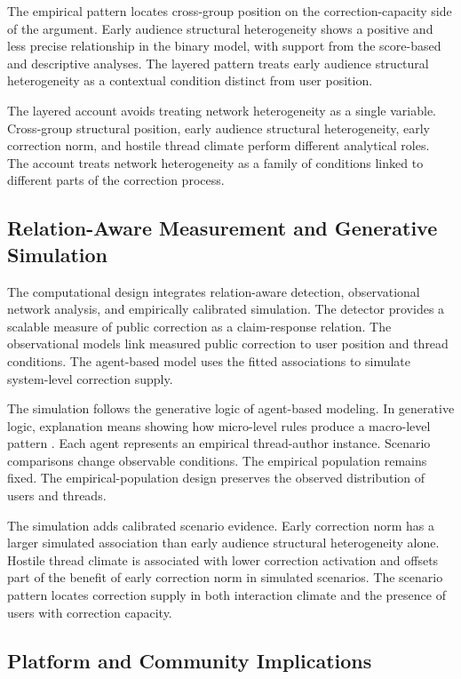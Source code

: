 \documentclass[namedate,unnumsec,webpdf,contemporary,large]{oup-authoring-template}
\begin{document}
The empirical pattern locates cross-group position on the correction-capacity side of the argument. Early audience structural heterogeneity shows a positive and less precise relationship in the binary model, with support from the score-based and descriptive analyses. The layered pattern treats early audience structural heterogeneity as a contextual condition distinct from user position.

The layered account avoids treating network heterogeneity as a single variable. Cross-group structural position, early audience structural heterogeneity, early correction norm, and hostile thread climate perform different analytical roles. The account treats network heterogeneity as a family of conditions linked to different parts of the correction process.

\subsection{Relation-Aware Measurement and Generative Simulation}


The computational design integrates relation-aware detection, observational network analysis, and empirically calibrated simulation. The detector provides a scalable measure of public correction as a claim-response relation. The observational models link measured public correction to user position and thread conditions. The agent-based model uses the fitted associations to simulate system-level correction supply.

The simulation follows the generative logic of agent-based modeling. In generative logic, explanation means showing how micro-level rules produce a macro-level pattern \citep{epstein1999agentbased,epstein2006generative}. Each agent represents an empirical thread-author instance. Scenario comparisons change observable conditions. The empirical population remains fixed. The empirical-population design preserves the observed distribution of users and threads.

The simulation adds calibrated scenario evidence. Early correction norm has a larger simulated association than early audience structural heterogeneity alone. Hostile thread climate is associated with lower correction activation and offsets part of the benefit of early correction norm in simulated scenarios. The scenario pattern locates correction supply in both interaction climate and the presence of users with correction capacity.

\subsection{Platform and Community Implications}
\end{document}
